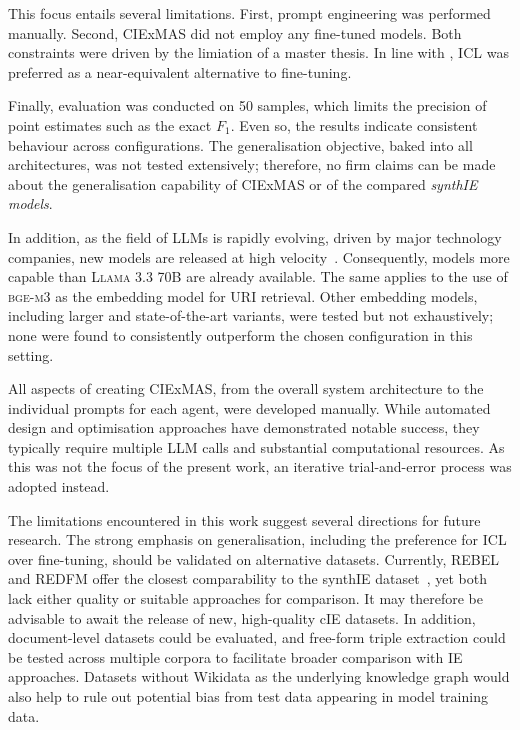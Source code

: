 \documentclass[a4paper,oneside,bibliography=totoc]{scrbook}
\begin{document}
This focus entails several limitations. First, prompt engineering was performed manually. Second, CIExMAS did not employ any fine-tuned models. Both constraints were driven by the limiation of a master thesis. In line with \citet{Brown2020}, \ac{ICL} was preferred as a near-equivalent alternative to fine-tuning.

Finally, evaluation was conducted on 50 samples, which limits the precision of point estimates such as the exact $F_{1}$. Even so, the results indicate consistent behaviour across configurations. The generalisation objective, baked into all architectures, was not tested extensively; therefore, no firm claims can be made about the generalisation capability of CIExMAS or of the compared \textit{synthIE models}.

In addition, as the field of \acp{LLM} is rapidly evolving, driven by major technology companies, new models are released at high velocity~\cite{Brown2020,Grattafiori2024,MetaAI2025,Chiang2024}. Consequently, models more capable than \textsc{Llama 3.3 70B} are already available. The same applies to the use of \textsc{bge-m3} as the embedding model for \ac{URI} retrieval. Other embedding models, including larger and state-of-the-art variants, were tested but not exhaustively; none were found to consistently outperform the chosen configuration in this setting.

All aspects of creating CIExMAS, from the overall system architecture to the individual prompts for each agent, were developed manually. While automated design and optimisation approaches have demonstrated notable success, they typically require multiple \ac{LLM} calls and substantial computational resources. As this was not the focus of the present work, an iterative trial-and-error process was adopted instead.

The limitations encountered in this work suggest several directions for future research. The strong emphasis on generalisation, including the preference for \ac{ICL} over fine-tuning, should be validated on alternative datasets. Currently, REBEL and REDFM offer the closest comparability to the synthIE dataset~\cite{HuguetCabot2021,Cabot2023}, yet both lack either quality or suitable approaches for comparison. It may therefore be advisable to await the release of new, high-quality \ac{cIE} datasets. In addition, document-level datasets could be evaluated, and free-form triple extraction could be tested across multiple corpora to facilitate broader comparison with \ac{IE} approaches. Datasets without Wikidata as the underlying knowledge graph would also help to rule out potential bias from test data appearing in model training data.
\end{document}
